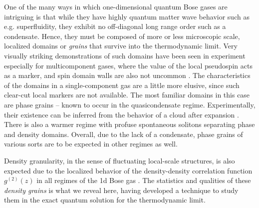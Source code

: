 \documentclass[aps,twocolumn,pra,superscriptaddress,nofootinbib,amsmath,amssymb,floats,floatfix,english]{revtex4-1}
\begin{document}
One of the many ways in which one-dimensional quantum Bose gases are intriguing is that while they have highly quantum matter wave behavior such as e.g. superfluidity, they exhibit no off-diagonal long range order such as a condensate.
Hence, they must be composed of more or less microscopic scale, 
localized domains or \emph{grains} that survive into the thermodynamic limit. Very visually striking demonstrations of such domains have been seen in experiment especially for multicomponent gases, where the value of the local pseudospin acts as a marker, and spin domain walls are also not uncommon \cite{Sadler06,Vinit13,De14}.
The characteristics of the domains in a single-component gas are a little more elusive, since such clear-cut local markers are not available. 
The most familiar domains in this case are phase grains -- known to occur in the quasicondensate regime. Experimentally, their existence can be inferred from the behavior of a cloud after expansion \cite{Petrov00,Dettmer01,Hellweg03,Gring12,Deuar16}. 
There is also a warmer regime with profuse spontaneous solitons \cite{Karpiuk12,Karpiuk15,Gawryluk17,Nowicki17} separating phase and density domains. 
 Overall, due to the lack of a condensate, phase grains of various sorts are to be expected in other regimes as well. 

Density granularity, in the sense of fluctuating local-scale structures, is 
also expected due to the localized behavior of the density-density correlation function $g^{(2)}(z)$  
in all regimes of the 1d Bose gas \cite{Sykes08,Deuar09,Wang13,Nandani16}.
The statistics and qualities of these \emph{density grains} is what we reveal here, having developed a technique to study them in the exact quantum solution for the thermodynamic limit. 
\end{document}
